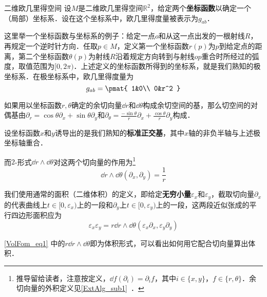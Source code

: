 \begin{example}{二维欧几里得空间}\label{VolFom_ex1}
设$M$是二维欧几里得空间$\mathbb{R}^2$，给定两个\textbf{坐标函数}以确定一个（局部）坐标系．设在这个坐标系中，欧几里得度量被表示为$g_{ab}$．

这里举一个坐标函数与坐标系的例子：给定一点$o$和从这一点出发的一根射线$R$，再规定一个逆时针方向．任取$p\in M$，定义第一个坐标函数$r(p)$为$p$到给定点的距离，第二个坐标函数$\theta(p)$为射线$R$沿着规定方向转到与射线$op$重合时所经过的弧度，取值范围为$[0, 2\pi)$．上述定义的坐标函数所得到的坐标系，就是我们熟知的极坐标系．在极坐标系中，欧几里得度量为
\begin{equation}
g_{ab}=\pmat{
    1&0\\
    0&r^2
}
\end{equation}


如果用以坐标函数$r, \theta$确定的余切向量$\dd r$和$\dd \theta$构成余切空间的基，那么切空间的对偶基由$\partial_r=\cos\theta\partial_x+\sin\theta\partial_y$和$\partial_\theta=\frac{-\sin\theta}{r}\partial_x+\frac{\cos\theta}{r}\partial_y$构成．



设坐标函数$x$和$y$诱导出的是我们熟知的\textbf{标准正交基}，其中$x$轴的非负半轴与上述极坐标轴重合．





而$2$-形式$\dd r\wedge\dd \theta$对这两个切向量的作用为\footnote{推导留给读者，注意按定义，$\dd f(\partial_i)=\partial_i f$，其中$i\in\{x, y\}$，$f\in\{r, \theta\}$．余切向量的外积定义见\autoref{ExtAlg_sub1}~．}
\begin{equation}
\dd r\wedge\dd \theta(\partial_x, \partial_y) = \frac{1}{r}
\end{equation}

我们使用通常的面积（二维体积）的定义，即给定\textbf{无穷小量}$\varepsilon_x$和$\varepsilon_y$，截取切向量$\partial_x$的代表曲线上$t\in[0, \varepsilon_x)$上的一段和$\partial_y$上$t\in[0, \varepsilon_y)$上的一段，这两段近似张成的平行四边形面积应为
\begin{equation}\label{VolFom_eq1}
\varepsilon_x\varepsilon_y = r\dd r\wedge\dd \theta(\varepsilon_x\partial_x, \varepsilon_y\partial_y)
\end{equation}


\autoref{VolFom_eq1} 中的$r\dd r\wedge\dd \theta$即为体积形式，可以看出如何用它配合切向量算出体积．


\end{example}



